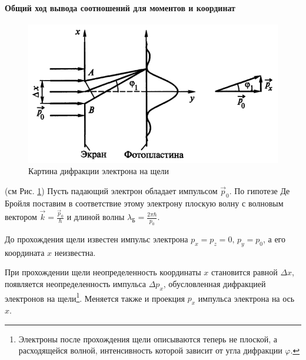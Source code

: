 \begin{multicols}{2}
	\paragraph{Общий ход вывода соотношений для моментов и координат}
	\begin{figure}[H]
		\centering
		\includegraphics[width=.9\linewidth]{img/oral-01/electron-difraction}
		\caption{Картина дифракции электрона на щели}
		\label{fig:electron-difraction}
	\end{figure}
	(см Рис. \ref{fig:electron-difraction}) Пусть падающий электрон обладает импульсом $\vec p_0$. По гипотезе Де Бройля поставим в соответствие этому электрону плоскую волну с волновым вектором $\vec k = \frac{\vec p_0}{\hbar}$ и длиной волны $\lambda_{\text{Б}}=\frac{2\pi\hbar}{p_0}$.
	
	До прохождения щели известен импульс электрона $p_x=p_z=0,\, p_y=p_0$, а его координата $x$ неизвестна.
	
	При прохождении щели неопределенность координаты $x$ становится равной $\Delta x$, появляется неопределенность импульса $\Delta p_x$, обусловленная дифракцией электронов на щели\footnote{Электроны после прохождения щели описываются теперь не плоской, а расходящейся волной, интенсивность которой зависит от угла дифракции $\varphi$.}. Меняется также и проекция $p_x$ импульса электрона на ось $x$.
	

\end{multicols}
